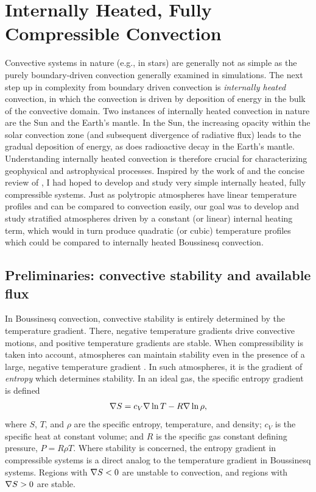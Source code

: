 \section{Internally Heated, Fully Compressible Convection}
\label{sec:internally_heated}
Convective systems in nature (e.g., in stars) are generally not as simple as the purely boundary-driven convection generally examined in simulations.
The next step up in complexity from boundary driven convection is \emph{internally heated} convection, in which the convection is driven by deposition of energy in the bulk of the convective domain.
Two instances of internally heated convection in nature are the Sun and the Earth's mantle.
In the Sun, the increasing opacity within the solar convection zone (and subsequent divergence of radiative flux) leads to the gradual deposition of energy, as does radioactive decay in the Earth's mantle.
Understanding internally heated convection is therefore crucial for characterizing geophysical and astrophysical processes.
Inspired by the work of \citet{goluskin&spiegel2012} and the concise review of \citet{goluskin2016}, I had hoped to develop and study very simple internally heated, fully compressible systems.
Just as polytropic atmospheres have linear temperature profiles and can be compared to \RB convection easily, our goal was to develop and study stratified atmospheres driven by a constant (or linear) internal heating term, which would in turn produce quadratic (or cubic) temperature profiles which could be compared to internally heated Boussinesq convection.

\subsection{Preliminaries: convective stability and available flux}
\label{sec:stability}
In Boussinesq convection, convective stability is entirely determined by the temperature gradient.
There, negative temperature gradients drive convective motions, and positive temperature gradients are stable.
When compressibility is taken into account, atmospheres can maintain stability even in the presence of a large, negative temperature gradient \citep{spiegel&veronis1960}.
In such atmospheres, it is the gradient of \emph{entropy} which determines stability.
In an ideal gas, the specific entropy gradient is defined
\begin{equation}
\nabla S = c_V \nabla\ln T - R \nabla\ln\rho,
\end{equation}
where $S$, $T$, and $\rho$ are the specific entropy, temperature, and density; $c_V$ is the specific heat at constant volume; and $R$ is the specific gas constant defining pressure, $P = R \rho T$.
Where stability is concerned, the entropy gradient in compressible systems is a direct analog to the temperature gradient in Boussinesq systems.
Regions with $\nabla S < 0$ are unstable to convection, and regions with $\nabla S > 0$ are stable.

